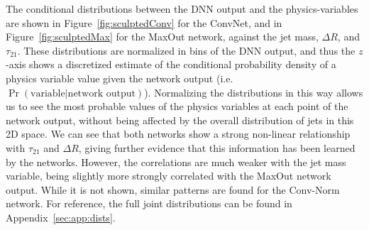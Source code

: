 The conditional distributions between the DNN output and the physics-variables are shown in Figure~\ref{fig:sculptedConv} for the ConvNet, and in Figure~\ref{fig:sculptedMax} for the MaxOut network, against the jet mass, $\Delta R$, and $\tau_{21}$.   These distributions are normalized in bins of the DNN output, and thus the $z$-axis shows a discretized estimate of the conditional probability density of a physics variable value given the network output (i.e. $\Pr(\text{variable}|\text{network output})$). Normalizing the distributions in this way allows us to see the most probable values of the physics variables at each point of the network output, without being affected by the overall distribution of jets in this 2D space.  We can see that both networks show a strong non-linear relationship with $\tau_{21}$ and $\Delta R$, giving further evidence that this information has been learned by the networks.  However, the correlations are much weaker with the jet mass variable, being slightly more strongly correlated with the MaxOut network output.  While it is not shown, similar patterns are found for the Conv-Norm network.   For reference, the full joint distributions can be found in Appendix~\ref{sec:app:dists}. 
